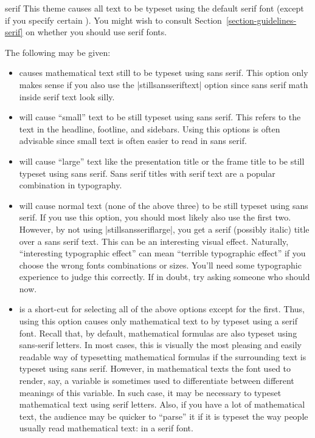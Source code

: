 \begin{fontthemeexample}{serif}
  This theme causes all text to be typeset using the default serif font
  (except if you specify certain ). You might wish to
  consult Section~\ref{section-guidelines-serif} on whether you should
  use serif fonts.

  The following  may be given:
  \begin{itemize}
  \item
    causes mathematical text still to be typeset using sans
    serif. This option only makes sense if you also use the
    |stillsansseriftext| option since sans serif math inside serif
    text look silly. 
  \item
    will cause ``small'' text to be still typeset using sans
    serif. This refers to the text in the headline, footline, and
    sidebars.  Using this options is often advisable since small text
    is often easier to read in sans serif.
  \item
    will cause ``large'' text like the presentation title or the frame
    title to be still typeset using sans serif. Sans serif titles with
    serif text are a popular combination in typography.
  \item
    will cause normal text (none of the above three) to be still
    typeset using sans serif. If you use this option, you should most
    likely also use the first two. However, by not using
    |stillsansseriflarge|, you get a serif (possibly italic) title
    over a sans serif text. This can be an interesting visual
    effect. Naturally, ``interesting typographic effect'' can mean
    ``terrible typographic effect'' if you choose the wrong fonts
    combinations or sizes. You'll need some typographic experience to
    judge this correctly. If in doubt, try asking someone who should
    now. 
  \item
    is a short-cut for selecting all of the above options except for
    the first. Thus, using this option causes only mathematical text
    to by typeset using a serif font. Recall that, by default,
    mathematical formulas are also typeset using sans-serif
    letters. In most cases, this is visually the most pleasing and
    easily readable way of typesetting mathematical formulas if the
    surrounding text is typeset using sans serif. However,
    in mathematical texts the font used to render, say, a variable is
    sometimes used to differentiate between different meanings of this
    variable. In such case, it may be necessary to typeset
    mathematical text using serif letters. Also, if you have a lot of
    mathematical text, the audience may be quicker to ``parse'' it if
    it is typeset the way people usually read mathematical text: in a
    serif font. 
  \end{itemize}
\end{fontthemeexample}




